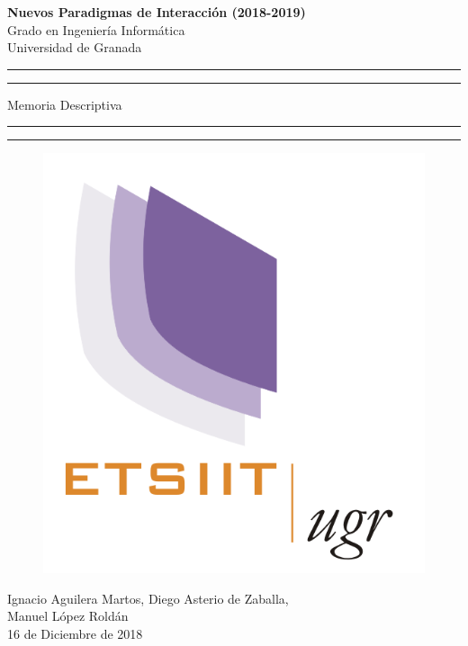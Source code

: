 \documentclass[a4paper,11pt]{article}
\begin{document}
	\begin{center}
		\LARGE{\textbf{Nuevos Paradigmas de Interacción (2018-2019)} \\ Grado en Ingeniería Informática \\ Universidad de Granada }
		\vspace*{2.5cm}

		\rule{\textwidth}{1.6pt}\vspace*{-\baselineskip}\vspace*{4pt}
		\rule{\textwidth}{1.6pt}\vspace*{-\baselineskip}\vspace*{2pt}
		\vspace{0.5cm}

		\Huge{Memoria Descriptiva}

		\vspace{0.5cm}
		\rule{\textwidth}{1.6pt}\vspace*{-\baselineskip}\vspace*{2pt}
		\rule{\textwidth}{1.6pt}\vspace*{-\baselineskip}\vspace*{4pt}

		\vspace{2cm}

\begin{figure}[h!]
	\centering
	\includegraphics[scale=1]{./Imagenes/logo_informatica.png}
	\label{fig:logougrciencias}
\end{figure}

		\vspace{4cm}
		\LARGE{Ignacio Aguilera Martos, Diego Asterio de Zaballa,\\ Manuel López Roldán \\ 16 de Diciembre de 2018 }

	\end{center}
\end{document}
